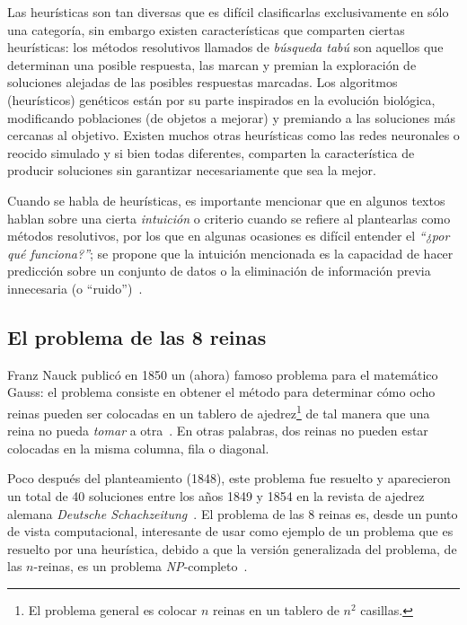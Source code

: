 Las heurísticas son tan diversas que es difícil clasificarlas exclusivamente en sólo 
una categoría, sin embargo existen características que comparten ciertas heurísticas:
los métodos resolutivos llamados de \textit{búsqueda tabú} son aquellos que determinan 
una posible respuesta, las marcan y premian la exploración de soluciones alejadas de las 
posibles respuestas marcadas. Los algoritmos (heurísticos) genéticos están por su parte 
inspirados en la evolución biológica, modificando poblaciones (de objetos a mejorar) y 
premiando a las soluciones más cercanas al objetivo. Existen muchos otras heurísticas como 
las redes neuronales o reocido simulado y si bien todas diferentes, comparten la 
característica de producir soluciones sin garantizar necesariamente que sea la mejor.

Cuando se habla de heurísticas, es importante mencionar que en algunos
textos~\cite{Pearl1984} hablan sobre una cierta \textit{intuición} o criterio
cuando se refiere al plantearlas como métodos resolutivos, por
los que en algunas ocasiones es difícil entender el \textit{``¿por qué
  funciona?''}; se propone que la intuición mencionada es la capacidad de hacer
predicción sobre un conjunto de datos o la eliminación de información previa
innecesaria (o ``ruido'')~\cite{Gigerenzer2008}.

\subsection{El problema de las 8 reinas}

Franz Nauck publicó en 1850 un (ahora) famoso problema para el matemático Gauss:
el problema consiste en obtener el método para determinar cómo ocho reinas
pueden ser colocadas en un tablero de ajedrez\footnote{El problema general es
  colocar $n$ reinas en un tablero de $n^{2}$ casillas.} de tal manera que una
reina no pueda \textit{tomar} a otra~\cite{RouseBall2008}. En otras palabras,
dos reinas no pueden estar colocadas en la misma columna, fila o diagonal.



Poco después del planteamiento (1848), este problema fue resuelto y aparecieron
un total de 40 soluciones entre los años 1849 y 1854 en la revista de ajedrez
alemana \textit{Deutsche Schachzeitung}~\cite{Campbell1977}.  El problema de las
8 reinas es, desde un punto de vista computacional, interesante de usar como 
ejemplo de un problema que es resuelto por una heurística, debido a que la 
versión generalizada del problema, de las $n$-reinas, es un problema 
\textsl{NP}-completo~\cite{Gent2017}.

